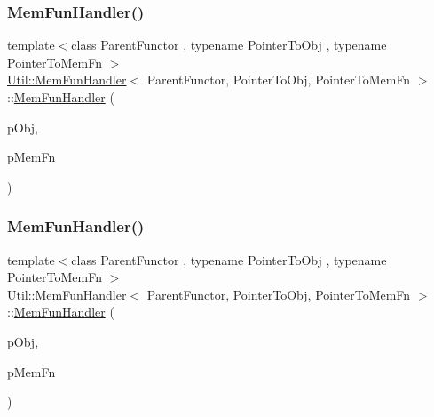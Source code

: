 \subsubsection{\texorpdfstring{MemFunHandler()}{MemFunHandler()}\hspace{0.1cm}{\footnotesize\ttfamily [1/3]}}
{\footnotesize\ttfamily template$<$class Parent\+Functor , typename Pointer\+To\+Obj , typename Pointer\+To\+Mem\+Fn $>$ \\
\mbox{\hyperlink{classUtil_1_1MemFunHandler}{Util\+::\+Mem\+Fun\+Handler}}$<$ Parent\+Functor, Pointer\+To\+Obj, Pointer\+To\+Mem\+Fn $>$\+::\mbox{\hyperlink{classUtil_1_1MemFunHandler}{Mem\+Fun\+Handler}} (\begin{DoxyParamCaption}\item[{const Pointer\+To\+Obj \&}]{p\+Obj,  }\item[{Pointer\+To\+Mem\+Fn}]{p\+Mem\+Fn }\end{DoxyParamCaption})\hspace{0.3cm}{\ttfamily [inline]}}

\mbox{\label{classUtil_1_1MemFunHandler_af946fcda2a7e2d785062d6bb5f544b76}} 
\subsubsection{\texorpdfstring{MemFunHandler()}{MemFunHandler()}\hspace{0.1cm}{\footnotesize\ttfamily [2/3]}}
{\footnotesize\ttfamily template$<$class Parent\+Functor , typename Pointer\+To\+Obj , typename Pointer\+To\+Mem\+Fn $>$ \\
\mbox{\hyperlink{classUtil_1_1MemFunHandler}{Util\+::\+Mem\+Fun\+Handler}}$<$ Parent\+Functor, Pointer\+To\+Obj, Pointer\+To\+Mem\+Fn $>$\+::\mbox{\hyperlink{classUtil_1_1MemFunHandler}{Mem\+Fun\+Handler}} (\begin{DoxyParamCaption}\item[{const Pointer\+To\+Obj \&}]{p\+Obj,  }\item[{Pointer\+To\+Mem\+Fn}]{p\+Mem\+Fn }\end{DoxyParamCaption})\hspace{0.3cm}{\ttfamily [inline]}}

